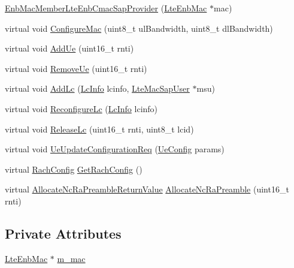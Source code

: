 \begin{DoxyCompactItemize}
\item 
\hyperlink{classns3_1_1EnbMacMemberLteEnbCmacSapProvider_ac866de54e43d3750bab5007d90a7c5c8}{Enb\+Mac\+Member\+Lte\+Enb\+Cmac\+Sap\+Provider} (\hyperlink{classns3_1_1LteEnbMac}{Lte\+Enb\+Mac} $\ast$mac)
\item 
virtual void \hyperlink{classns3_1_1EnbMacMemberLteEnbCmacSapProvider_a184d801e5d6435a3003c4be64ba6684a}{Configure\+Mac} (uint8\+\_\+t ul\+Bandwidth, uint8\+\_\+t dl\+Bandwidth)
\item 
virtual void \hyperlink{classns3_1_1EnbMacMemberLteEnbCmacSapProvider_abb2f7e709c6c954f47e77f6f8d478e83}{Add\+Ue} (uint16\+\_\+t rnti)
\item 
virtual void \hyperlink{classns3_1_1EnbMacMemberLteEnbCmacSapProvider_a64f9e80719cf93f435392591c155d802}{Remove\+Ue} (uint16\+\_\+t rnti)
\item 
virtual void \hyperlink{classns3_1_1EnbMacMemberLteEnbCmacSapProvider_a05822ef7cfcafad8f720852d727279df}{Add\+Lc} (\hyperlink{structns3_1_1LteEnbCmacSapProvider_1_1LcInfo}{Lc\+Info} lcinfo, \hyperlink{classns3_1_1LteMacSapUser}{Lte\+Mac\+Sap\+User} $\ast$msu)
\item 
virtual void \hyperlink{classns3_1_1EnbMacMemberLteEnbCmacSapProvider_acf09cf7c4dd3677a08ede89aac81b161}{Reconfigure\+Lc} (\hyperlink{structns3_1_1LteEnbCmacSapProvider_1_1LcInfo}{Lc\+Info} lcinfo)
\item 
virtual void \hyperlink{classns3_1_1EnbMacMemberLteEnbCmacSapProvider_a82a27c48dccddf92a8ab59a78708768b}{Release\+Lc} (uint16\+\_\+t rnti, uint8\+\_\+t lcid)
\item 
virtual void \hyperlink{classns3_1_1EnbMacMemberLteEnbCmacSapProvider_a4c1f337f19a970c757322022a42095f4}{Ue\+Update\+Configuration\+Req} (\hyperlink{structns3_1_1LteEnbCmacSapProvider_1_1UeConfig}{Ue\+Config} params)
\item 
virtual \hyperlink{structns3_1_1LteEnbCmacSapProvider_1_1RachConfig}{Rach\+Config} \hyperlink{classns3_1_1EnbMacMemberLteEnbCmacSapProvider_aa25de81faa19d41090ce34837d09c5de}{Get\+Rach\+Config} ()
\item 
virtual \hyperlink{structns3_1_1LteEnbCmacSapProvider_1_1AllocateNcRaPreambleReturnValue}{Allocate\+Nc\+Ra\+Preamble\+Return\+Value} \hyperlink{classns3_1_1EnbMacMemberLteEnbCmacSapProvider_a6760e7769f2cfdf6cd71b978dc87cd78}{Allocate\+Nc\+Ra\+Preamble} (uint16\+\_\+t rnti)
\end{DoxyCompactItemize}
\subsection*{Private Attributes}
\begin{DoxyCompactItemize}
\item 
\hyperlink{classns3_1_1LteEnbMac}{Lte\+Enb\+Mac} $\ast$ \hyperlink{classns3_1_1EnbMacMemberLteEnbCmacSapProvider_ac2d70228025a053d953f93a23c29266e}{m\+\_\+mac}
\end{DoxyCompactItemize}


